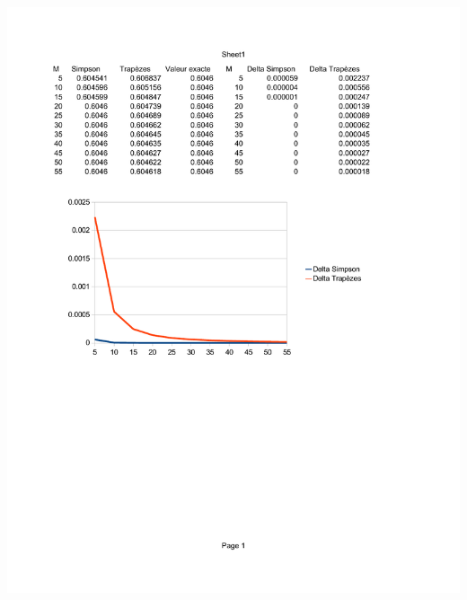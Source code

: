 \documentclass[10pt]{article}
\begin{document}
\includegraphics[scale=0.8]{delta.pdf}
\end{document}
